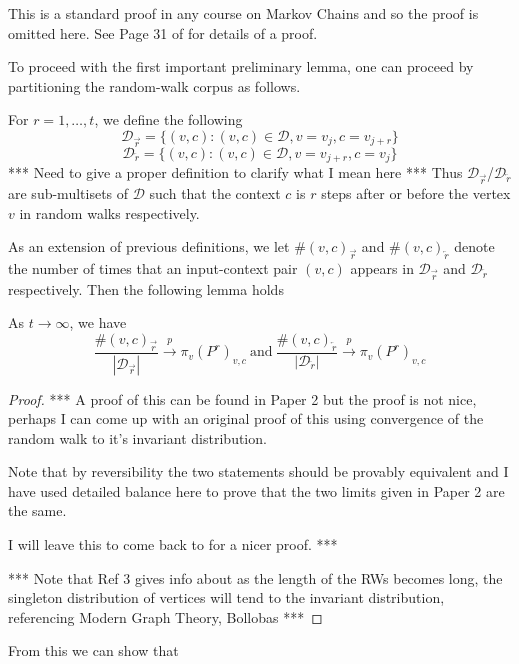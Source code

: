 \documentclass[a4paper]{article}
\newcommand{\D}{\mathcal D}
\newcommand{\rar}{\overrightarrow r}
\newcommand{\lar}{\overleftarrow r}
\begin{document}
This is a standard proof in any course on Markov Chains and so the proof is
omitted here. See Page 31 of \cite{markov_chains} for details of a proof.

To proceed with the first important preliminary lemma, one can proceed by
partitioning the random-walk corpus as follows.

\begin{definition}
  For $r = 1, \dots, t$, we define the following
  \[\D_{\rar} = \{ (v, c) : (v, c) \in \D, v = v_j, c = v_{j+r}\}\]
  \[\D_{\lar} = \{ (v, c) : (v, c) \in \D, v = v_{j+r}, c = v_{j}\}\]
  *** Need to give a proper definition to clarify what I mean here ***
  Thus $\D_{\rar}$/$\D_{\lar}$ are sub-multisets of $\D$ such that the context
  $c$ is $r$ steps after or before the vertex $v$ in random walks respectively.
\end{definition}

As an extension of previous definitions, we let $\#(v, c)_{\rar}$ and $\#(v,
c)_{\lar}$ denote the number of times that an input-context pair $(v,c)$ appears
in $\D_{\rar}$ and $\D_{\lar}$ respectively. Then the following lemma holds
\begin{lemma}
  As $t \to \infty$, we have
  \[\frac{\#(v, c)_{\rar}}{|\D_{\rar}|} \overset{p}{\to} \pi_v(P^r)_{v,c} \  \text{and}
    \ \frac{\#(v, c)_{\lar}}{|\D_{\lar}|} \overset{p}{\to} \pi_v(P^r)_{v,c} \]
\end{lemma}
\begin{proof}
  ***
  A proof of this can be found in Paper 2 but the proof is not nice, perhaps I can
  come up with an original proof of this using convergence of the random walk to
  it's invariant distribution.

  Note that by reversibility the two statements should be provably equivalent and
  I have used detailed balance here to prove that the two limits given in Paper 2
  are the same.

  I will leave this to come back to for a nicer proof.
  ***


  *** Note that Ref 3 gives info about as the length of the RWs becomes long, the
  singleton distribution of vertices will tend to the invariant distribution,
  referencing Modern Graph Theory, Bollobas ***
\end{proof}

From this we can show that
\end{document}
